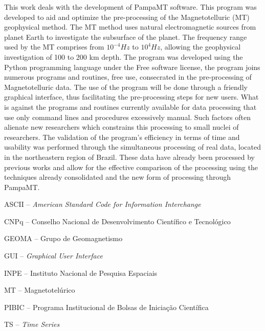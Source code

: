 \documentclass[12pt,twoside,oneright,a4paper,chapter=TITLE,english,brazil]{unipampa}
\newcommand{\en}[1]{\textit{#1}}
\begin{document}
\begin{resumoingles}
This work deals with the development of PampaMT software. This program was developed to aid and optimize the pre-processing of the Magnetotelluric (MT) geophysical method. The MT method uses natural electromagnetic sources from planet Earth to investigate the subsurface of the planet. The frequency range used by the MT comprises from $10^{-4} Hz$ to $10^{4} Hz$, allowing the geophysical investigation of 100 to 200 km depth. The program was developed using the Python programming language under the Free software license, the program joins numerous programs and routines, free use, consecrated in the pre-processing of Magnetotelluric data. The use of the program will be done through a friendly graphical interface, thus facilitating the pre-processing steps for new users. What is against the programs and routines currently available for data processing that use only command lines and procedures excessively manual. Such factors often alienate new researchers which constrains this processing to small nuclei of researchers. The validation of the program's efficiency in terms of time and usability was performed through the simultaneous processing of real data, located in the northeastern region of Brazil. These data have already been processed by previous works and allow for the effective comparison of the processing using the techniques already consolidated and the new form of processing through PampaMT.
\end{resumoingles}


\listoffigures      %


\begin{siglas}
    \item[ASCII --]            \en{American Standard Code for Information Interchange}
    \item[CNPq --]              Conselho Nacional de Desenvolvimento Científico e Tecnológico
    \item[GEOMA --]             Grupo de Geomagnetismo
    \item[GUI --]              \en{Graphical User Interface}
    \item[INPE --]              Instituto Nacional de Pesquisa Espaciais
    \item[MT --]               Magnetotelúrico
    \item[PIBIC --]             Programa Institucional de Bolsas de Iniciação Científica
    \item[TS --]               \en{Time Series}
\end{siglas}
\end{document}
